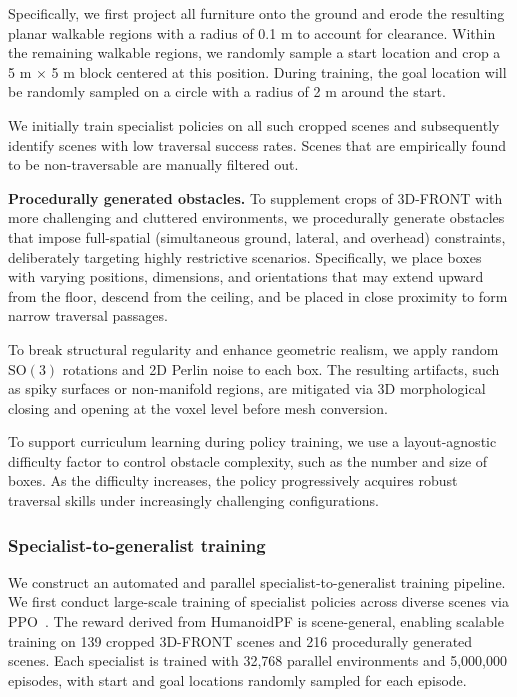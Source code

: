 Specifically, we first project all furniture onto the ground and erode the resulting planar walkable regions with a radius of 0.1 m to account for clearance. Within the remaining walkable regions, we randomly sample a start location and crop a 5 m × 5 m block centered at this position. During training, the goal location will be randomly sampled on a circle with a radius of 2 m around the start.

We initially train specialist policies on all such cropped scenes and subsequently identify scenes with low traversal success rates. Scenes that are empirically found to be non-traversable are manually filtered out.


\textbf{Procedurally generated obstacles.} To supplement crops of 3D-FRONT with more challenging and cluttered environments, we procedurally generate obstacles that impose full-spatial (simultaneous ground, lateral, and overhead) constraints, deliberately targeting highly restrictive scenarios. Specifically, we place boxes with varying positions, dimensions, and orientations that may extend upward from the floor, descend from the ceiling, and be placed in close proximity to form narrow traversal passages.

To break structural regularity and enhance geometric realism, we apply random $\mathrm{SO}(3)$ rotations and 2D Perlin noise to each box. The resulting artifacts, such as spiky surfaces or non-manifold regions, are mitigated via 3D morphological closing and opening at the voxel level before mesh conversion.

To support curriculum learning during policy training, we use a layout-agnostic difficulty factor to control obstacle complexity, such as the number and size of boxes. As the difficulty increases, the policy progressively acquires robust traversal skills under increasingly challenging configurations.



\subsubsection{Specialist-to-generalist training}
\label{sec:spe_to_gen}
We construct an automated and parallel specialist-to-generalist training pipeline. We first conduct large-scale training of specialist policies across diverse scenes via PPO~\cite{schulman2017proximal}. The reward derived from HumanoidPF is scene-general, enabling scalable training on 139 cropped 3D-FRONT scenes and 216 procedurally generated scenes. Each specialist is trained with 32,768 parallel environments and 5,000,000 episodes, with start and goal locations randomly sampled for each episode.

